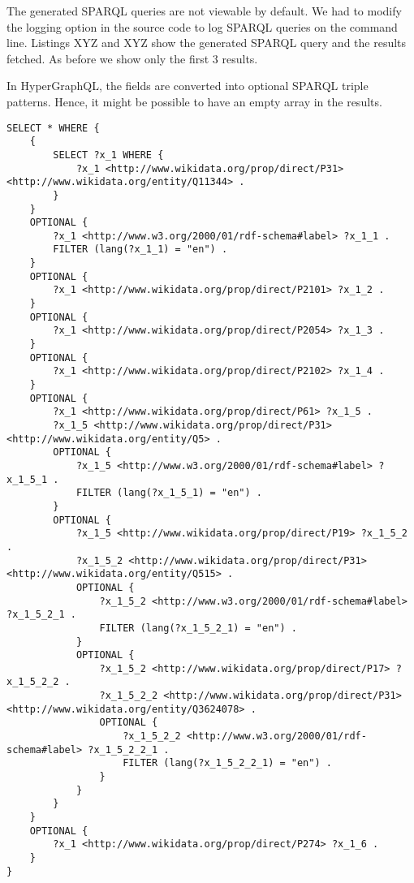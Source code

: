 The generated SPARQL queries are not viewable by default. We had to modify the logging option in the source code to log SPARQL queries on the command line. Listings XYZ and XYZ show the generated SPARQL query and the results fetched. As before we show only the first 3 results. 

In HyperGraphQL, the fields are converted into optional SPARQL triple patterns. Hence, it might be possible to have an empty array in the results.

\begin{minipage}{\linewidth}
\begin{lstlisting}[label=listing:listing32, caption={Generated SPARQL Query}]
SELECT * WHERE { 
	{ 
		SELECT ?x_1 WHERE { 
			?x_1 <http://www.wikidata.org/prop/direct/P31> <http://www.wikidata.org/entity/Q11344> . 
		}  
	}  
	OPTIONAL { 
		?x_1 <http://www.w3.org/2000/01/rdf-schema#label> ?x_1_1 .
		FILTER (lang(?x_1_1) = "en") .  
	}  
	OPTIONAL { 
		?x_1 <http://www.wikidata.org/prop/direct/P2101> ?x_1_2 . 
	}  
	OPTIONAL { 
		?x_1 <http://www.wikidata.org/prop/direct/P2054> ?x_1_3 . 
	}  
	OPTIONAL { 
		?x_1 <http://www.wikidata.org/prop/direct/P2102> ?x_1_4 . 
	}  
	OPTIONAL { 
		?x_1 <http://www.wikidata.org/prop/direct/P61> ?x_1_5 .
		?x_1_5 <http://www.wikidata.org/prop/direct/P31> <http://www.wikidata.org/entity/Q5> . 
		OPTIONAL { 
			?x_1_5 <http://www.w3.org/2000/01/rdf-schema#label> ?x_1_5_1 .
			FILTER (lang(?x_1_5_1) = "en") .  
		}  
		OPTIONAL { 
			?x_1_5 <http://www.wikidata.org/prop/direct/P19> ?x_1_5_2 .
			?x_1_5_2 <http://www.wikidata.org/prop/direct/P31> <http://www.wikidata.org/entity/Q515> . 
			OPTIONAL { 
				?x_1_5_2 <http://www.w3.org/2000/01/rdf-schema#label> ?x_1_5_2_1 .
				FILTER (lang(?x_1_5_2_1) = "en") .  
			}  
			OPTIONAL { 
				?x_1_5_2 <http://www.wikidata.org/prop/direct/P17> ?x_1_5_2_2 .
				?x_1_5_2_2 <http://www.wikidata.org/prop/direct/P31> <http://www.wikidata.org/entity/Q3624078> . 
				OPTIONAL { 
					?x_1_5_2_2 <http://www.w3.org/2000/01/rdf-schema#label> ?x_1_5_2_2_1 .
					FILTER (lang(?x_1_5_2_2_1) = "en") .  
				}  
			}  
		}  
	}  
	OPTIONAL { 
		?x_1 <http://www.wikidata.org/prop/direct/P274> ?x_1_6 . 
	}  
}
\end{lstlisting}
\end{minipage}

